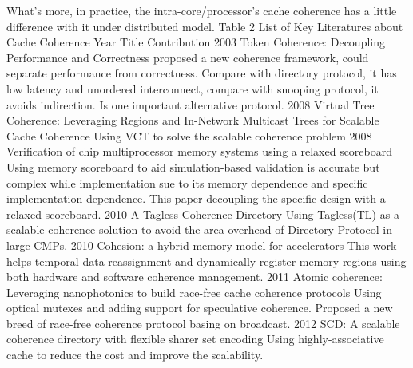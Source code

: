 \par What's more, in practice, the intra-core/processor's cache coherence has a little difference with it under distributed model. 
Table 2 List of Key Literatures about Cache Coherence
Year	Title	Contribution
2003\cite{martin2003token}
Token Coherence: Decoupling Performance and Correctness	proposed a new coherence framework, could separate performance from correctness.
Compare with directory protocol, it has low latency and unordered interconnect, compare with snooping protocol, it avoids indirection. Is one important alternative protocol.
2008\cite{jerger2008virtual}
Virtual Tree Coherence: Leveraging Regions and In-Network Multicast Trees for Scalable Cache Coherence	Using VCT to solve the scalable coherence problem
2008\cite{shacham2008verification}
Verification of chip multiprocessor memory systems using a relaxed scoreboard	Using memory scoreboard to aid simulation-based validation is accurate but complex while implementation sue to its memory dependence and specific implementation dependence. This paper decoupling the specific design with a relaxed scoreboard.
2010\cite{zebchuk2009tagless}
A Tagless Coherence Directory	Using Tagless(TL) as a scalable coherence solution to avoid the area overhead of Directory Protocol in large CMPs.
2010\cite{kelm2010cohesion}
Cohesion: a hybrid memory model for accelerators	This work helps temporal data reassignment and dynamically register memory regions using both hardware and software coherence management. 
2011\cite{vantrease2011atomic}
Atomic coherence: Leveraging nanophotonics to build race-free cache coherence protocols	Using optical mutexes and adding support for speculative coherence. Proposed a new breed of race-free coherence protocol basing on broadcast.
2012\cite{sanchez2012scd}
SCD: A scalable coherence directory with flexible sharer set encoding	Using highly-associative cache to reduce the cost and improve the scalability.

